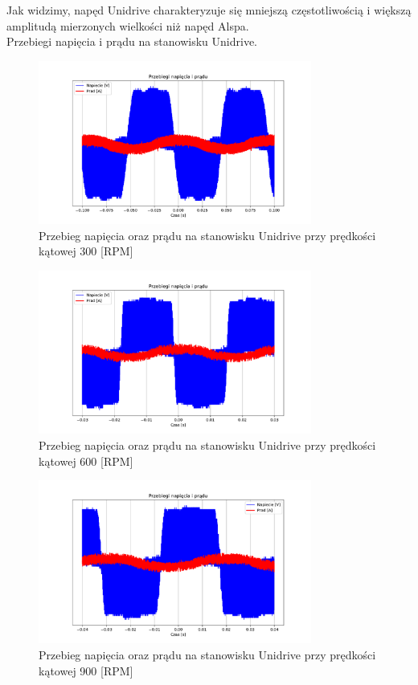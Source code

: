 \documentclass[11pt]{article}
\begin{document}
Jak widzimy, napęd Unidrive charakteryzuje się mniejszą częstotliwością i większą amplitudą mierzonych wielkości niż napęd Alspa.\\

Przebiegi napięcia i prądu na stanowisku Unidrive.\\

\begin{figure}[H]
\centering
\includegraphics[width=0.8\textwidth]{aun1_unidrive_rpm300.pdf}
\caption{Przebieg napięcia oraz prądu na stanowisku Unidrive przy prędkości kątowej 300 [RPM]}
\end{figure}

\begin{figure}[H]
\centering
\includegraphics[width=0.8\textwidth]{aun1_unidrive_rpm600.pdf}
\caption{Przebieg napięcia oraz prądu na stanowisku Unidrive przy prędkości kątowej 600 [RPM]}
\end{figure}

\begin{figure}[H]
\centering
\includegraphics[width=0.8\textwidth]{aun1_unidrive_rpm900.pdf}
\caption{Przebieg napięcia oraz prądu na stanowisku Unidrive przy prędkości kątowej 900 [RPM]}
\end{figure}
\end{document}
